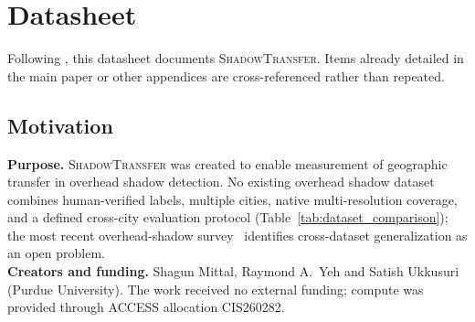 \section{Datasheet}
\label{app:datasheet}

Following \cite{gebru2021datasheets}, this datasheet documents \textsc{ShadowTransfer}.
Items already detailed in the main paper or other appendices are cross-referenced
rather than repeated.

\subsection{Motivation}
\textbf{Purpose.} \textsc{ShadowTransfer} was created to enable measurement of
geographic transfer in overhead shadow detection. No existing overhead shadow
dataset combines human-verified labels, multiple cities, native multi-resolution
coverage, and a defined cross-city evaluation protocol (Table~\ref{tab:dataset_comparison});
the most recent overhead-shadow survey~\citep{hu2026unveiling} identifies
cross-dataset generalization as an open problem.\\
\textbf{Creators and funding.} Shagun Mittal, Raymond A.\ Yeh and Satish Ukkusuri (Purdue University). The work received no external funding; compute was provided through ACCESS allocation CIS260282.

